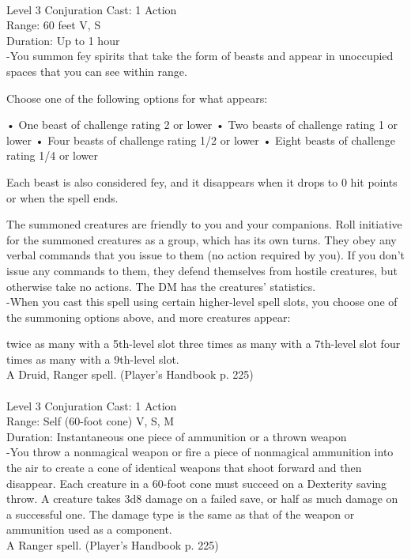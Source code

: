 \documentclass[10pt,twocolumn]{report}
\begin{document}
 \\
Level 3 \quad Conjuration \quad Cast: 1 Action\\
Range: 60 feet \quad V, S\\
Duration: Up to 1 hour \quad \\
-You summon fey spirits that take the form of beasts and appear in unoccupied spaces that you can see within range. 

Choose one of the following options for what appears: 

•  One beast of challenge rating 2 or lower 
•  Two beasts of challenge rating 1  or lower 
•  Four beasts of challenge rating 1/2 or lower 
•  Eight beasts of challenge rating 1/4 or lower 

Each beast is also considered fey, and it disappears when it drops to 0 hit points or when the spell ends. 

The summoned creatures are friendly to you and your companions. Roll initiative for the summoned creatures as a group, which has its own turns. They obey any verbal commands that you issue to them (no action required by you). If you don’t issue any commands to them, they defend themselves from hostile creatures, but otherwise take no actions. 
The DM has the creatures’ statistics.\\
-When you cast this spell using certain higher-level spell slots, you choose one of the summoning options above, and more creatures appear: 

twice as many with a 5th-level slot
three times as many with a 7th-level slot 
four times as many with a 9th-level slot.\\
A Druid, Ranger spell. (Player's Handbook p. 225) \\


 \\
Level 3 \quad Conjuration \quad Cast: 1 Action\\
Range: Self (60-foot cone) \quad V, S, M \\
Duration: Instantaneous \quad one piece of ammunition or a thrown weapon\\
-You throw a nonmagical weapon or fire a piece of nonmagical ammunition into the air to create a cone of identical weapons that shoot forward and then disappear. Each creature in a 60-foot cone must succeed on a Dexterity saving throw. A creature takes 3d8 damage on a failed save, or half as much damage on a successful one. The damage type is the same as that of the weapon or ammunition used as a component.\\
A Ranger spell. (Player's Handbook p. 225) \\
\end{document}
